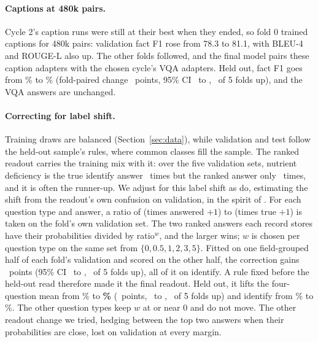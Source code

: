 \documentclass[10pt,twocolumn]{article}
\begin{document}
\paragraph{Captions at 480k pairs.} Cycle 2's caption runs were still at their best when they ended, so fold 0 trained captions for 480k pairs: validation fact F1 rose from 78.3 to 81.1, with BLEU-4 and ROUGE-L also up. The other folds followed, and the final model pairs these caption adapters with the chosen cycle's VQA adapters. Held out, fact F1 goes from \vtwoFactF\% to \blipFactF\% (fold-paired change \capChange\ points, 95\% CI \capChangeLo\ to \capChangeHi, \capChangeFolds\ of 5 folds up), and the VQA answers are unchanged.

\paragraph{Correcting for label shift.} Training draws are balanced (Section~\ref{sec:data}), while validation and test follow the held-out sample's rules, where common classes fill the sample. The ranked readout carries the training mix with it: over the five validation sets, nutrient deficiency is the true identify answer \corrNdTrue\ times but the ranked answer only \corrNdSaid\ times, and it is often the runner-up. We adjust for this label shift as \cite{saerens2002adjusting} do, estimating the shift from the readout's own confusion on validation, in the spirit of \cite{lipton2018detecting}. For each question type and answer, a ratio of (times answered $+1$) to (times true $+1$) is taken on the fold's own validation set. The two ranked answers each record stores have their probabilities divided by ratio$^w$, and the larger wins; $w$ is chosen per question type on the same set from $\{0, 0.5, 1, 2, 3, 5\}$. Fitted on one field-grouped half of each fold's validation and scored on the other half, the correction gains \corrValChange\ points (95\% CI \corrValLo\ to \corrValHi, \corrValFolds\ of 5 folds up), all of it on identify. A rule fixed before the held-out read therefore made it the final readout. Held out, it lifts the four-question mean from \blipMean\% to \textbf{\blipCorrMean\%} (\corrChange\ points, \corrChangeLo\ to \corrChangeHi, \corrChangeFolds\ of 5 folds up) and identify from \blipIdentify\% to \corrIdentify\%. The other question types keep $w$ at or near 0 and do not move. The other readout change we tried, hedging between the top two answers when their probabilities are close, lost on validation at every margin.
\end{document}
